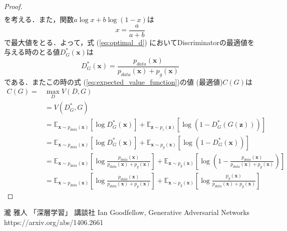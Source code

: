 \documentclass[uplatex]{jsarticle}
\begin{document}
\begin{proof}
\begin{align}
        \end{align}
        を考える．また，関数$a\log x + b \log(1-x)$は
        \begin{equation}
            x = \frac{a}{a+b}
        \end{equation}
        で最大値をとる．よって，式 (\ref{eq:optimal_d}) においてDiscriminatorの最適値を与える時のとる値$D^{\ast}_G (\bm{x})$は
        \begin{equation}
            D^{\ast}_G (\bm{x}) = 
            \frac{p_{data} (\bm{x})}{p_{data} (\bm{x}) + p_g (\bm{x})} \label{eq:optimal}
        \end{equation}
        である．またこの時の式 (\ref{eq:expected_value_function})の値 (最適値)$C(G)$は
        \begin{align}
            C(G) = &\max_D V (D, G) \\
            &= V (D^{\ast}_G , G) \\
            &=\mathbb{E}_{\bm{x}\sim p_{data}(\bm{x})}\left[\log D^{\ast}_G(\bm{x})\right] 
            + \mathbb{E}_{\bm{z} \sim {p_{z}(\bm{z})}}\left[\log{\left(1-D^{\ast}_G\left(G \left(\bm{z}\right) \right) \right)}\right] \\
            &= \mathbb{E}_{\bm{x}\sim p_{data}(\bm{x})}\left[\log D^{\ast}_G(\bm{x})\right] 
            + \mathbb{E}_{\bm{x} \sim {p_{g}(\bm{x})}}\left[\log{\left(1-D^{\ast}_G\left(\bm{x}  \right) \right)}\right] \\
            &= \mathbb{E}_{\bm{x}\sim p_{data}(\bm{x})}\left[\log \frac{p_{data} (\bm{x})}{p_{data} (\bm{x}) + p_g (\bm{x})} \right] 
            + \mathbb{E}_{\bm{x} \sim {p_{g}(\bm{x})}}\left[\log{\left(1- \frac{p_{data} (\bm{x})}{p_{data} (\bm{x}) + p_g (\bm{x})}  \right)}\right] \\
            &= \mathbb{E}_{\bm{x}\sim p_{data}(\bm{x})}\left[\log \frac{p_{data} (\bm{x})}{p_{data} (\bm{x}) + p_g (\bm{x})} \right] 
            + \mathbb{E}_{\bm{x} \sim {p_{g}(\bm{x})}}\left[\log{\frac{p_{g} (\bm{x})}{p_{data} (\bm{x}) + p_g (\bm{x})} }\right]
        \end{align}
    \end{proof}

    \newpage
    \begin{thebibliography}{10}
            瀧 雅人 「深層学習」
            講談社
            Ian Goodfellow, Generative Adversarial Networks \\
            https://arxiv.org/abs/1406.2661
    \end{thebibliography}

    
\end{document}
